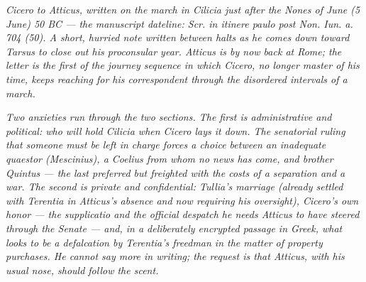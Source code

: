 
\textit{Cicero to Atticus, written on the march in
Cilicia just after the Nones of June (5 June) 50 BC ---
the manuscript dateline: \textit{Scr. in itinere paulo
post Non. Iun. a. 704 (50)}. A short, hurried note
written between halts as he comes down toward Tarsus
to close out his proconsular year. Atticus is by now
back at Rome; the letter is the first of the journey
sequence in which Cicero, no longer master of his time,
keeps reaching for his correspondent through the
disordered intervals of a march.}

\textit{Two anxieties run through the two sections.
The first is administrative and political: who will
hold Cilicia when Cicero lays it down. The senatorial
ruling that someone must be left in charge forces a
choice between an inadequate quaestor (Mescinius), a
Coelius from whom no news has come, and brother
Quintus --- the last preferred but freighted with the
costs of a separation and a war. The second is private
and confidential: Tullia's marriage (already settled
with Terentia in Atticus's absence and now requiring
his oversight), Cicero's own \textit{honor} --- the
supplicatio and the official despatch he needs Atticus
to have steered through the Senate --- and, in a
deliberately encrypted passage in Greek, what looks to
be a defalcation by Terentia's freedman in the matter
of property purchases. He cannot say more in writing;
the request is that Atticus, with his usual nose,
should follow the scent.}
